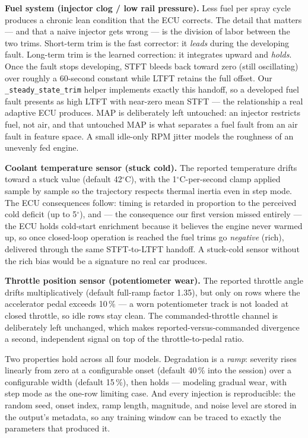 \textbf{Fuel system (injector clog / low rail pressure).} Less fuel per
spray cycle produces a chronic lean condition that the ECU corrects. The
detail that matters --- and that a naive injector gets wrong --- is the
division of labor between the two trims. Short-term trim is the fast
corrector: it \emph{leads} during the developing fault. Long-term trim is
the learned correction: it integrates upward and \emph{holds}. Once the
fault stops developing, STFT bleeds back toward zero (still oscillating)
over roughly a 60-second constant while LTFT retains the full offset. Our
\texttt{\_steady\_state\_trim} helper implements exactly this handoff, so a
developed fuel fault presents as high LTFT with near-zero mean STFT --- the
relationship a real adaptive ECU produces. MAP is deliberately left
untouched: an injector restricts fuel, not air, and that untouched MAP is
what separates a fuel fault from an air fault in feature space. A small
idle-only RPM jitter models the roughness of an unevenly fed engine.

\textbf{Coolant temperature sensor (stuck cold).} The reported temperature
drifts toward a stuck value (default 42$^{\circ}$C), with the
1$^{\circ}$C-per-second clamp applied sample by sample so the trajectory
respects thermal inertia even in step mode. The ECU consequences follow:
timing is retarded in proportion to the perceived cold deficit (up to
5$^{\circ}$), and --- the consequence our first version missed entirely ---
the ECU holds cold-start enrichment because it believes the engine never
warmed up, so once closed-loop operation is reached the fuel trims go
\emph{negative} (rich), delivered through the same STFT-to-LTFT handoff. A
stuck-cold sensor without the rich bias would be a signature no real car
produces.

\textbf{Throttle position sensor (potentiometer wear).} The reported
throttle angle drifts multiplicatively (default full-ramp factor 1.35), but
only on rows where the accelerator pedal exceeds 10\,\% --- a worn
potentiometer track is not loaded at closed throttle, so idle rows stay
clean. The commanded-throttle channel is deliberately left unchanged, which
makes reported-versus-commanded divergence a second, independent signal on
top of the throttle-to-pedal ratio.

Two properties hold across all four models. Degradation is a \emph{ramp}:
severity rises linearly from zero at a configurable onset (default 40\,\%
into the session) over a configurable width (default 15\,\%), then holds
--- modeling gradual wear, with step mode as the one-row limiting case.
And every injection is reproducible: the random seed, onset index, ramp
length, magnitude, and noise level are stored in the output's metadata, so
any training window can be traced to exactly the parameters that produced
it.

